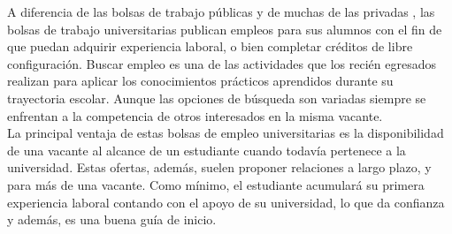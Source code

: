 A diferencia de las bolsas de trabajo públicas y de muchas de las privadas , las bolsas de trabajo universitarias publican empleos para sus alumnos con el fin de que puedan adquirir experiencia laboral, o bien completar créditos de libre configuración. Buscar empleo es una de las actividades que los recién egresados realizan para aplicar los conocimientos prácticos aprendidos durante su trayectoria escolar. Aunque las opciones de búsqueda son variadas siempre se enfrentan a la competencia de otros 
interesados en la misma vacante. \cite{UniJob}\\

La principal ventaja de estas bolsas de empleo universitarias es la disponibilidad de una vacante al alcance de un estudiante cuando todavía 
pertenece a la universidad. Estas ofertas, además, suelen proponer relaciones a largo plazo, y para más de una vacante. 
Como mínimo, el estudiante acumulará su primera experiencia laboral contando con el apoyo de su universidad, lo que da confianza y además, es una buena guía de inicio.

 
    